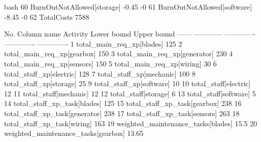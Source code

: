     \begin{boxminted}{bash}
        60 BurnOutNotAllowed[storage]
        -0.45                          -0 
        61 BurnOutNotAllowed[software]
                -8.45                          -0 
        62 TotalCosts               7588                             

        No. Column name       Activity     Lower bound   Upper bound
        ------ ------------    ------------- ------------- -------------
        1 total_main_req_xp[blades]
                125                             
        2 total_main_req_xp[gearbox]
                150                             
        3 total_main_req_xp[generator]
                230                             
        4 total_main_req_xp[sensors]
                150                             
        5 total_main_req_xp[wiring]
                30                             
        6 total_staff_xp[electric]
                128                             
        7 total_staff_xp[mechanic]
                100                             
        8 total_staff_xp[storage]
                25                             
        9 total_staff_xp[software]
                10                             
        10 total_staff[electric]
                12                             
        11 total_staff[mechanic]
                12                             
        12 total_staff[storage]
                    6                             
        13 total_staff[software]
                    5                             
        14 total_staff_xp_task[blades]
                125                             
        15 total_staff_xp_task[gearbox]
                238                             
        16 total_staff_xp_task[generator]
                238                             
        17 total_staff_xp_task[sensors]
                263                             
        18 total_staff_xp_task[wiring]
                163                             
        19 weighted_maintenance_tasks[blades]
                15.5                             
        20 weighted_maintenance_tasks[gearbox]
                13.65                             
    \end{boxminted}
    \newpage
    \vspace{2pt}
